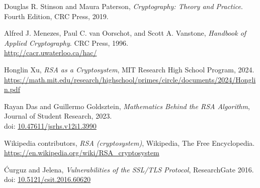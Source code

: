 \documentclass[11pt,a4paper]{article}
\numberwithin{equation}{section}
\begin{document}
\begin{thebibliography}{99}

Douglas R. Stinson and Maura Paterson, 
\textit{Cryptography: Theory and Practice}. 
Fourth Edition, CRC Press, 2019.

Alfred J. Menezes, Paul C. van Oorschot, and Scott A. Vanstone, 
\textit{Handbook of Applied Cryptography}. 
CRC Press, 1996.\\
\url{http://cacr.uwaterloo.ca/hac/}

Honglin Xu,
\textit{RSA as a Cryptosystem},
MIT Research High School Program, 2024.\\
\url{https://math.mit.edu/research/highschool/primes/circle/documents/2024/Honglin.pdf}

Rayan Das and Guillermo Goldsztein,
\textit{Mathematics Behind the RSA Algorithm},
Journal of Student Research, 2023.\\
doi: \href{https://doi.org/10.47611/jsrhs.v12i1.3990}{10.47611/jsrhs.v12i1.3990}

Wikipedia contributors,
\textit{RSA (cryptosystem)},
Wikipedia, The Free Encyclopedia. \\
\url{https://en.wikipedia.org/wiki/RSA_cryptosystem} 

Ćurguz and Jelena,
\textit{Vulnerabilities of the SSL/TLS Protocol},
ResearchGate 2016. \\
doi: \href{https://doi.org/10.5121/csit.2016.60620}{10.5121/csit.2016.60620}

\end{thebibliography}

\end{document}
